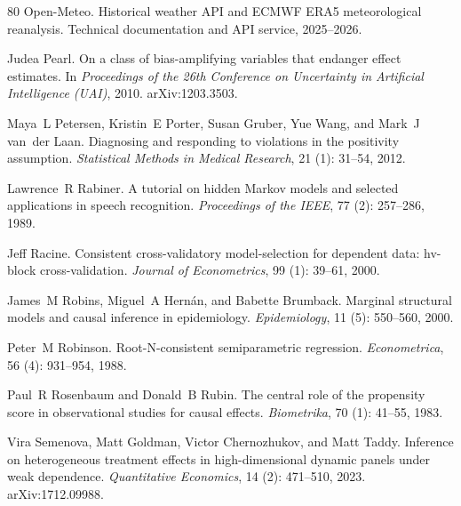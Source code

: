 \begin{thebibliography}{80}
Open-Meteo.
\newblock Historical weather API and ECMWF ERA5 meteorological reanalysis.
\newblock Technical documentation and API service, 2025--2026.

Judea Pearl.
\newblock On a class of bias-amplifying variables that endanger effect estimates.
\newblock In \emph{Proceedings of the 26th Conference on Uncertainty in Artificial Intelligence (UAI)}, 2010.
\newblock arXiv:1203.3503.

Maya~L Petersen, Kristin~E Porter, Susan Gruber, Yue Wang, and Mark~J van~der Laan.
\newblock Diagnosing and responding to violations in the positivity assumption.
\newblock \emph{Statistical Methods in Medical Research}, 21 (1): 31--54, 2012.

Lawrence~R Rabiner.
\newblock A tutorial on hidden {M}arkov models and selected applications in speech recognition.
\newblock \emph{Proceedings of the IEEE}, 77 (2): 257--286, 1989.

Jeff Racine.
\newblock Consistent cross-validatory model-selection for dependent data: hv-block cross-validation.
\newblock \emph{Journal of Econometrics}, 99 (1): 39--61, 2000.

James~M Robins, Miguel~A Hern{\'a}n, and Babette Brumback.
\newblock Marginal structural models and causal inference in epidemiology.
\newblock \emph{Epidemiology}, 11 (5): 550--560, 2000.

Peter~M Robinson.
\newblock Root-{N}-consistent semiparametric regression.
\newblock \emph{Econometrica}, 56 (4): 931--954, 1988.

Paul~R Rosenbaum and Donald~B Rubin.
\newblock The central role of the propensity score in observational studies for causal effects.
\newblock \emph{Biometrika}, 70 (1): 41--55, 1983.

Vira Semenova, Matt Goldman, Victor Chernozhukov, and Matt Taddy.
\newblock Inference on heterogeneous treatment effects in high-dimensional dynamic panels under weak dependence.
\newblock \emph{Quantitative Economics}, 14 (2): 471--510, 2023.
\newblock arXiv:1712.09988.


\end{thebibliography}
